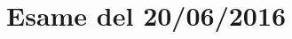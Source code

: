 \documentclass[\main/main.tex]{subfiles}
\begin{document}
\section{Esame del 20/06/2016}

\end{document}
